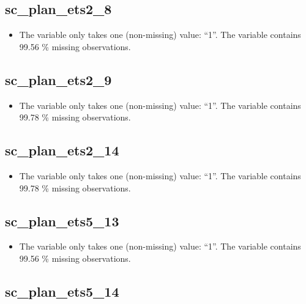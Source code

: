 \documentclass[
  letterpaper,
  DIV=11,
  numbers=noendperiod]{scrartcl}
\providecommand{\tightlist}{%
  \setlength{\itemsep}{0pt}\setlength{\parskip}{0pt}}
\begin{document}
\fullline

\subsection{sc\_plan\_ets2\_8}\label{sc_plan_ets2_8}

\begin{itemize}
\tightlist
\item
  The variable only takes one (non-missing) value: ``1''. The variable
  contains 99.56 \% missing observations.
\end{itemize}

\fullline

\subsection{sc\_plan\_ets2\_9}\label{sc_plan_ets2_9}

\begin{itemize}
\tightlist
\item
  The variable only takes one (non-missing) value: ``1''. The variable
  contains 99.78 \% missing observations.
\end{itemize}

\fullline

\subsection{sc\_plan\_ets2\_14}\label{sc_plan_ets2_14}

\begin{itemize}
\tightlist
\item
  The variable only takes one (non-missing) value: ``1''. The variable
  contains 99.78 \% missing observations.
\end{itemize}

\fullline

\subsection{sc\_plan\_ets5\_13}\label{sc_plan_ets5_13}

\begin{itemize}
\tightlist
\item
  The variable only takes one (non-missing) value: ``1''. The variable
  contains 99.56 \% missing observations.
\end{itemize}

\fullline

\subsection{sc\_plan\_ets5\_14}\label{sc_plan_ets5_14}
\end{document}
